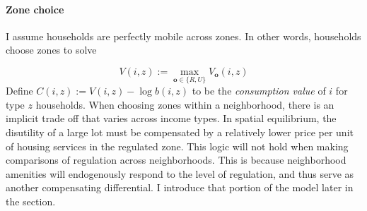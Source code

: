 \documentclass[12pt]{article}
\begin{document}
	

	\paragraph*{Zone choice}
	I assume households are perfectly mobile across zones. In other words, households choose zones to solve 
	
	\begin{equation}\label{zonechoice}
		V(i, z) := \max_{\boldsymbol{o} \in \{R, U\}}V_{\boldsymbol{o}}(i, z)
	\end{equation}
	Define $C(i, z) := V(i, z) - \log b(i, z)$ to be the \textit{consumption value} of $i$ for type $z$ households. When choosing zones within a neighborhood, there is an implicit trade off that varies across income types. In spatial equilibrium, the disutility of a large lot must be compensated by a relatively lower price per unit of housing services in the regulated zone. This logic will not hold when making comparisons of regulation across neighborhoods. This is because neighborhood amenities will endogenously respond to the level of regulation, and thus serve as another compensating differential. I introduce that portion of the model later in the section. 
\end{document}
